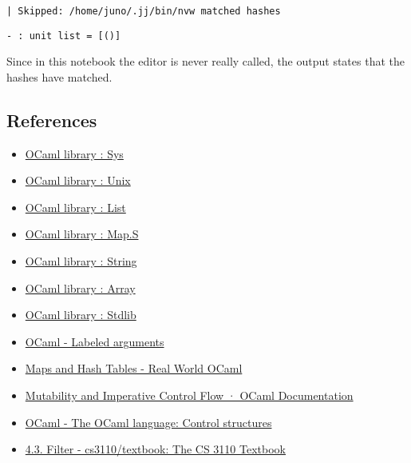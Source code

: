 \documentclass[11pt]{article}
\makeatletter
\providecommand{\tightlist}{%
      \setlength{\itemsep}{0pt}\setlength{\parskip}{0pt}}
\newcommand{\boxspacing}{\kern\kvtcb@left@rule\kern\kvtcb@boxsep}
\newcommand{\prompt}[4]{
        {\ttfamily\llap{{\color{#2}[#3]:\hspace{3pt}#4}}\vspace{-\baselineskip}}
    }
\makeatother
\begin{document}
    \begin{Verbatim}[commandchars=\\\{\}]
| Skipped: /home/juno/.jj/bin/nvw matched hashes
    \end{Verbatim}

            \begin{tcolorbox}[breakable, size=fbox, boxrule=.5pt, pad at break*=1mm, opacityfill=0]
\prompt{Out}{outcolor}{23}{\boxspacing}
\begin{Verbatim}[commandchars=\\\{\}]
- : unit list = [()]

\end{Verbatim}
\end{tcolorbox}
        Since in this notebook the editor is never really called, the output states that the hashes have matched.
    \hypertarget{references}{%
\subsection{References}\label{references}}

    \begin{itemize}
\tightlist
\item
  \href{https://v2.ocaml.org/api/Sys.html\#top}{OCaml library : Sys}
\item
  \href{https://v2.ocaml.org/api/Unix.html}{OCaml library : Unix}
\item
  \href{https://v2.ocaml.org/api/List.html}{OCaml library : List}
\item
  \href{https://v2.ocaml.org/api/Map.S.html}{OCaml library : Map.S}
\item
  \href{https://v2.ocaml.org/api/String.html}{OCaml library : String}
\item
  \href{https://v2.ocaml.org/api/Array.html}{OCaml library : Array}
\item
  \href{https://v2.ocaml.org/releases/5.1/api/Stdlib.html\#EXCEPTIONEnd_of_file}{OCaml
  library : Stdlib}
\item
  \href{https://v2.ocaml.org/manual/lablexamples.html\#sec43}{OCaml -
  Labeled arguments}
\item
  \href{https://dev.realworldocaml.org/maps-and-hashtables.html}{Maps
  and Hash Tables - Real World OCaml}
\item
  \href{https://ocaml.org/docs/mutability-imperative-control-flow\#imperative-control-flow}{Mutability
  and Imperative Control Flow · OCaml Documentation}
\item
  \href{https://v2.ocaml.org/manual/expr.html\#ss\%3Aexpr-control}{OCaml
  - The OCaml language: Control structures}
\item
  \href{https://github.com/cs3110/textbook}{4.3. Filter -
  cs3110/textbook: The CS 3110 Textbook}
\end{itemize}


    
    
    
\end{document}
